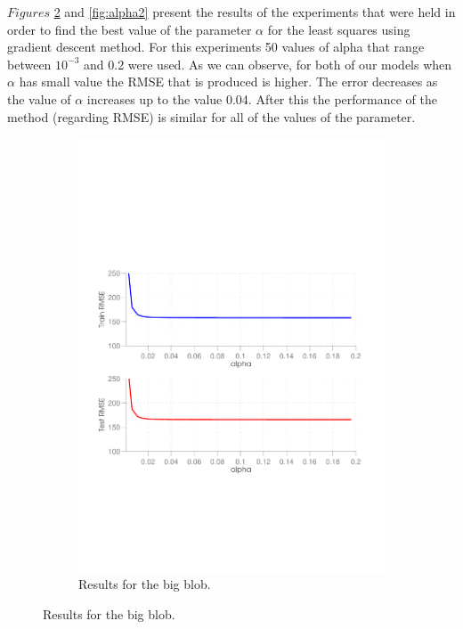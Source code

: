 $Figures$ \ref{fig:alpha1} and \ref{fig:alpha2} present the results of the experiments that were held in order to find the best value of the parameter $\alpha$ for the least squares using gradient descent method. For this experiments 50 values of alpha that range between $10^{-3}$ and 0.2 were used. As we can observe, for both of our models when $\alpha$ has small value the RMSE that is produced is higher. The error decreases as the value of $\alpha$ increases up to the value 0.04. After this the performance of the method (regarding RMSE) is similar for all of the values of the parameter.

\begin{figure}[ht]
  \centering
  \begin{subfigure}[b]{0.45\textwidth}
   \includegraphics[width=\textwidth]{figures/alpha_curve1.pdf}
    \caption{Results for the big blob.}
    \label{fig:alpha1}

\end{subfigure}
\end{figure}
